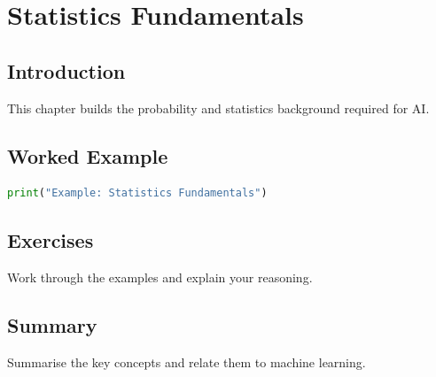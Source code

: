 \chapter{Statistics Fundamentals}
\label{chap:vol4-25}



\section{Introduction}
This chapter builds the probability and statistics background required for AI.

\section{Worked Example}
\begin{lstlisting}[language=Python]
print("Example: Statistics Fundamentals")
\end{lstlisting}

\section{Exercises}
\begin{exercise}
Work through the examples and explain your reasoning.
\end{exercise}

\section{Summary}
Summarise the key concepts and relate them to machine learning.
